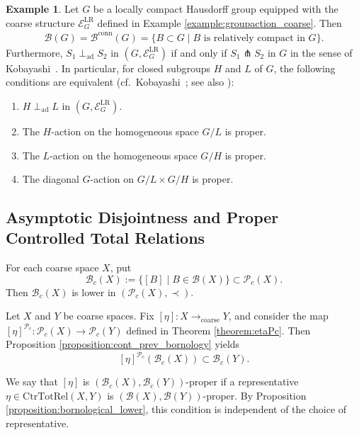 \documentclass[12pt, a4paper]{amsart}
\theoremstyle{definition}
\newtheorem{example}[theorem]{Example}
\newcommand{\CtrTotRel}{\mathrm{CtrTotRel}}
\newcommand{\adperp}{\mathrel{\perp_{\mathrm{ad}}}}
\begin{document}
\begin{example}\label{example:Kobayashipitchfork}
Let $G$ be a locally compact Hausdorff group equipped with the coarse structure $\mathcal{E}^{\mathrm{LR}}_G$ defined in Example \ref{example:groupaction_coarse}. Then
\begin{align*}
\mathcal{B}(G) = \mathcal{B}^{\mathrm{conn}}(G) 
= \{ B \subset G \mid B \text{ is relatively compact in } G \}.
\end{align*}
Furthermore, $S_1 \adperp S_2$ in $(G,\mathcal{E}^{\mathrm{LR}}_G)$ if and only if $S_1 \pitchfork S_2$ in $G$ in the sense of Kobayashi~\cite{Kobayashi96}. In particular, for closed subgroups $H$ and $L$ of $G$, the following conditions are equivalent (cf.~Kobayashi~\cite{Kobayashi89,Kobayashi92Fuji,Kobayashi96}; see also \cite[Remark 3.1.3]{KobayashiYoshino05}):
\begin{enumerate}
    \item $H \adperp L$ in $(G,\mathcal{E}^{\mathrm{LR}}_G)$.
    \item The $H$-action on the homogeneous space $G/L$ is proper.
    \item The $L$-action on the homogeneous space $G/H$ is proper.
    \item The diagonal $G$-action on $G/L \times G/H$ is proper.
\end{enumerate}
\end{example}

\subsection{Asymptotic Disjointness and Proper Controlled Total Relations}

For each coarse space $X$, put
\[
\mathcal{B}_c(X) := \{ [B] \mid B \in \mathcal{B}(X) \} \subset \mathcal{P}_c(X).
\]
Then $\mathcal{B}_c(X)$ is lower in $(\mathcal{P}_c(X),\prec)$.

Let $X$ and $Y$ be coarse spaces. Fix $[\eta] : X \rightarrow_{\mathrm{coarse}} Y$, and consider the map $[\eta]^{\mathcal{P}_c} : \mathcal{P}_c(X) \rightarrow \mathcal{P}_c(Y)$ defined in Theorem \ref{theorem:etaPc}. Then Proposition \ref{proposition:cont_prev_bornology} yields
\[
[\eta]^{\mathcal{P}_c}(\mathcal{B}_c(X)) \subset \mathcal{B}_c(Y).
\]

We say that $[\eta]$ is $(\mathcal{B}_c(X),\mathcal{B}_c(Y))$-proper if a representative $\eta \in \CtrTotRel(X,Y)$ is $(\mathcal{B}(X),\mathcal{B}(Y))$-proper. By Proposition \ref{proposition:bornological_lower}, this condition is independent of the choice of representative.
\end{document}
